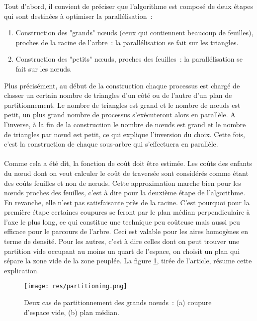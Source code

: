 \documentclass[a4paper]{article}
\begin{document}
Tout d'abord, il convient de préciser que l'algorithme est composé de deux étapes qui sont destinées à optimiser la parallélisation~:
\begin{enumerate}
	\item Construction des "grands" nœuds (ceux qui contiennent beaucoup de feuilles), proches de la racine de l'arbre~: la parallélisation se fait sur les triangles.
	\item Construction des "petits" nœuds, proches des feuilles~: la parallélisation se fait sur les nœuds.
\end{enumerate}
Plus précisément, au début de la construction chaque processus est chargé de classer un certain nombre de triangles d'un côté ou de l'autre d'un plan de partitionnement. Le nombre de triangles est grand et le nombre de nœuds est petit, un plus grand nombre de processus s’exécuteront alors en parallèle. A l'inverse, à la fin de la construction le nombre de nœuds est grand et le nombre de triangles par nœud est petit, ce qui explique l'inversion du choix. Cette fois, c'est la construction de chaque sous-arbre qui s'effectuera en parallèle.
\\\\
Comme cela a été dit, la fonction de coût doit être estimée. Les coûts des enfants du nœud dont on veut calculer le coût de traversée sont considérés comme étant des coûts feuilles et non de nœuds.
Cette approximation marche bien pour les nœuds proches des feuilles, c'est à dire pour la deuxième étape de l'algorithme. En revanche, elle n'est pas satisfaisante près de la racine. C'est pourquoi pour la première étape certaines coupures se feront par le plan médian perpendiculaire à l'axe le plus long, ce qui constitue une technique peu coûteuse mais aussi peu efficace pour le parcours de l'arbre. Ceci est valable pour les aires homogènes en terme de densité. Pour les autres, c'est à dire celles dont on peut trouver une partition vide occupant au moins un quart de l'espace, on choisit un plan qui sépare la zone vide de la zone peuplée. La figure \ref{fig:partition}, tirée de l'article, résume cette explication.

\begin{figure}[!h]
\centering
\texttt{[image: res/partitioning.png]}
\caption{\label{fig:partition}Deux cas de partitionnement des grands nœuds~: (a) coupure d'espace vide, (b) plan médian.}
\end{figure}

\end{document}
